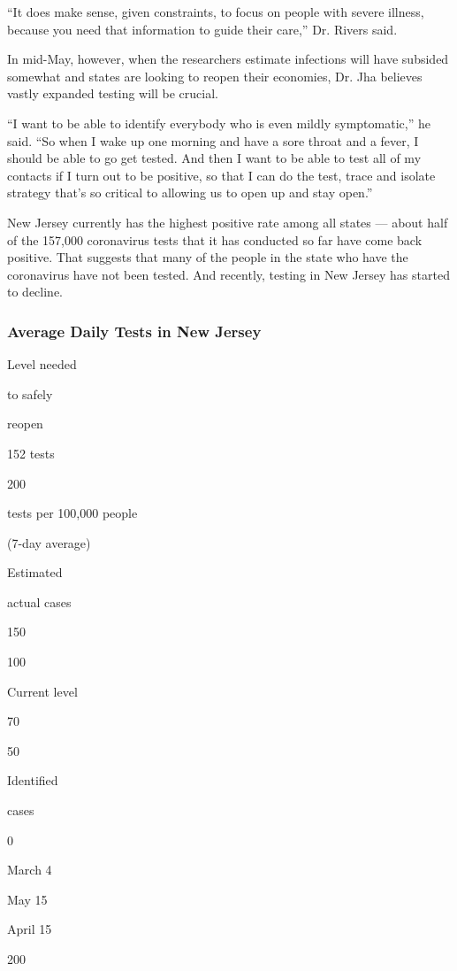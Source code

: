 ``It does make sense, given constraints, to focus on people with severe
illness, because you need that information to guide their care,'' Dr.
Rivers said.

In mid-May, however, when the researchers estimate infections will have
subsided somewhat and states are looking to reopen their economies, Dr.
Jha believes vastly expanded testing will be crucial.

``I want to be able to identify everybody who is even mildly
symptomatic,'' he said. ``So when I wake up one morning and have a sore
throat and a fever, I should be able to go get tested. And then I want
to be able to test all of my contacts if I turn out to be positive, so
that I can do the test, trace and isolate strategy that's so critical to
allowing us to open up and stay open.''

New Jersey currently has the highest positive rate among all states ---
about half of the 157,000 coronavirus tests that it has conducted so far
have come back positive. That suggests that many of the people in the
state who have the coronavirus have not been tested. And recently,
testing in New Jersey has started to decline.

\hypertarget{average-daily-tests-in-new-jersey}{%
\subsubsection{Average Daily Tests in New
Jersey}\label{average-daily-tests-in-new-jersey}}

Level needed

to safely

reopen

152 tests

200

tests per 100,000 people

(7-day average)

Estimated

actual cases

150

100

Current level

70

50

Identified

cases

0

March 4

May 15

April 15

200

